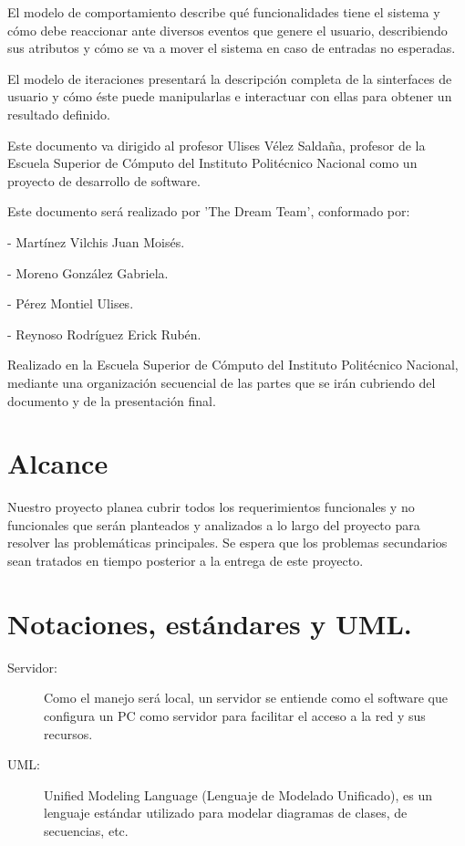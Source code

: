 El modelo de comportamiento describe qué funcionalidades tiene el sistema y cómo debe reaccionar ante diversos eventos que genere el usuario, describiendo sus atributos y cómo se va a mover el sistema en caso de entradas no esperadas.

El modelo de iteraciones presentará la descripción completa de la sinterfaces de usuario y cómo éste puede manipularlas e interactuar con ellas para obtener un resultado definido.

Este documento va dirigido al profesor Ulises Vélez Saldaña, profesor de la Escuela Superior de Cómputo del Instituto Politécnico Nacional como un proyecto de desarrollo de software.

Este documento será realizado por 'The Dream Team', conformado por:

- Martínez Vilchis Juan Moisés.

- Moreno González Gabriela.

- Pérez Montiel Ulises.

- Reynoso Rodríguez Erick Rubén.

Realizado en la Escuela Superior de Cómputo del Instituto Politécnico Nacional, mediante una organización secuencial de las partes que se irán cubriendo del documento y de la presentación final.

\section{Alcance}
Nuestro proyecto planea cubrir todos los requerimientos funcionales y no funcionales que serán planteados y analizados a lo largo del proyecto para resolver las problemáticas principales. Se espera que los problemas secundarios sean tratados en tiempo posterior a la entrega de este proyecto.

\section{Notaciones, estándares y UML.}

\begin{description}
	\item[Servidor:] Como el manejo será local, un servidor se entiende como el software que configura un PC como servidor para facilitar el acceso a la red y sus recursos.
\end{description}

\begin{description}
	\item[UML:] Unified Modeling Language (Lenguaje de Modelado Unificado), es un lenguaje estándar utilizado para modelar diagramas de clases, de secuencias, etc.
\end{description}

